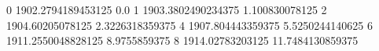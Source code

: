 0 1902.2794189453125 0.0
1 1903.3802490234375 1.100830078125
2 1904.60205078125 2.3226318359375
4 1907.804443359375 5.5250244140625
6 1911.2550048828125 8.9755859375
8 1914.02783203125 11.7484130859375
